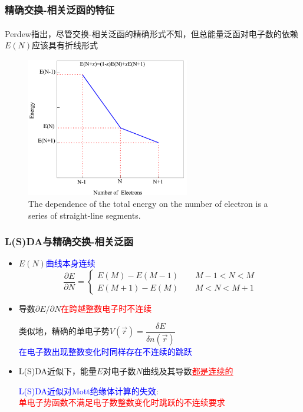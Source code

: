 \documentclass[cjk,slidestop,compress,mathserif,blue]{beamer}
\newcommand{\upcite}[1]{\hspace{0ex}\textsuperscript{\cite{#1}}} %
\begin{document}
\frame
{
	\frametitle{精确交换-相关泛函的特征}
	\textrm{Perdew}指出\upcite{PRL49-1691_1982}，尽管交换-相关泛函的精确形式不知，但总能量泛函对电子数的依赖$E(N)$应该具有折线形式
\begin{figure}[h!]
\centering
\vspace*{-0.4in}
\includegraphics[height=2.4in,width=2.8in,viewport=0 0 1000 880,clip]{Figures/exact-DFT.png}
\caption{\tiny \textrm{The dependence of the total energy on the number of electron is a series of straight-line segments.}}%
\label{exact-DFT}
\end{figure}
}

\frame
{
	\frametitle{\textrm{L(S)DA}与精确交换-相关泛函}
	\begin{itemize}
		\item $E(N)$\textcolor{blue}{曲线本身连续}
	\begin{displaymath}
		\dfrac{\partial E}{\partial N}=\left\{
		\begin{aligned}
			E(M)-E(M-1)\qquad M-1<N<M\\
			E(M+1)-E(M)\qquad M<N<M+1 
		\end{aligned}\right.
	\end{displaymath}
		\item 导数$\partial E/\partial N$\textcolor{red}{在跨越整数电子时不连续}

	类似地，精确的单电子势$V(\vec r)=\dfrac{\delta E}{\delta n(\vec r)}$\\
	\textcolor{blue}{在电子数出现整数变化时同样存在不连续的跳跃}
		\item \textrm{L(S)DA}近似下，能量$E$对电子数$N$曲线及其导数\textcolor{red}{\underline{都是连续的}}
	
			\vspace{10pt}
	\textcolor{blue}{\textrm{L(S)DA}近似对\textrm{Mott}绝缘体计算的失效}:\\
	\textcolor{red}{单电子势函数不满足电子数整数变化时跳跃的不连续要求}
	\end{itemize}
}
\end{document}
